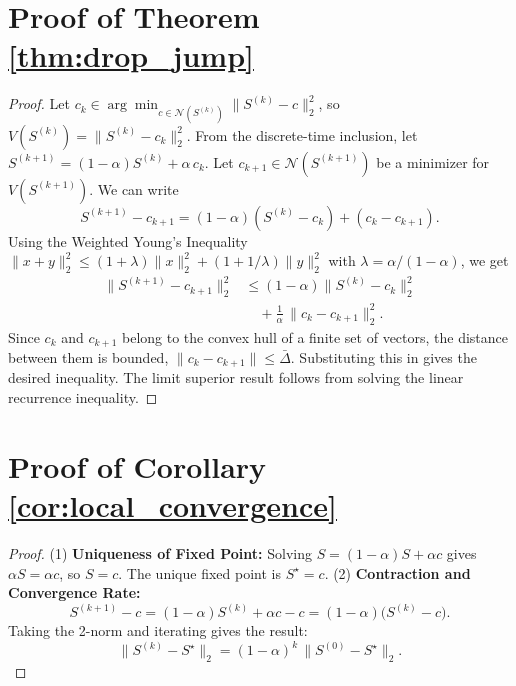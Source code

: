 \documentclass{ccjnl}
\begin{document}
\section{Proof of Theorem \ref{thm:drop_jump}}
\label{app:proof_thm_drop_jump}
\begin{proof}
Let $c_k\in\arg\min_{c\in\mathcal N(S^{(k)})}\|S^{(k)}-c\|_2^2$, so $V(S^{(k)})=\|S^{(k)}-c_k\|_2^2$.
From the discrete-time inclusion, let $S^{(k+1)}=(1-\alpha)S^{(k)}+\alpha\,c_k$.
Let $c_{k+1}\in\mathcal N(S^{(k+1)})$ be a minimizer for $V(S^{(k+1)})$. We can write
\begin{equation}
S^{(k+1)}-c_{k+1}=(1-\alpha)(S^{(k)}-c_k) + (c_k-c_{k+1}).
\end{equation}
Using the Weighted Young's Inequality $\|x+y\|_2^2\le (1+\lambda)\|x\|_2^2+(1+1/\lambda)\|y\|_2^2$ with $\lambda=\alpha/(1-\alpha)$, we get
\begin{equation}
\begin{split}
\|S^{(k+1)}-c_{k+1}\|_2^2
&\le (1-\alpha)\|S^{(k)}-c_k\|_2^2 \\
&\quad + \frac{1}{\alpha}\,\|c_k-c_{k+1}\|_2^2.
\end{split}
\end{equation}
Since $c_k$ and $c_{k+1}$ belong to the convex hull of a finite set of vectors, the distance between them is bounded, $\|c_k-c_{k+1}\|\le \bar\Delta$. Substituting this in gives the desired inequality. The limit superior result follows from solving the linear recurrence inequality.
\end{proof}

\section{Proof of Corollary \ref{cor:local_convergence}}
\label{app:proof_cor_local_convergence}
\begin{proof}
(1) \textbf{Uniqueness of Fixed Point:} Solving $S=(1-\alpha)S+\alpha c$ gives $\alpha S=\alpha c$, so $S=c$. The unique fixed point is $S^\star=c$.
(2) \textbf{Contraction and Convergence Rate:}
\begin{equation}
S^{(k+1)}-c = (1-\alpha)S^{(k)}+\alpha c-c = (1-\alpha)\big(S^{(k)}-c\big).
\end{equation}
Taking the 2-norm and iterating gives the result:
\begin{equation}
\|S^{(k)}-S^\star\|_2 = (1-\alpha)^k\,\|S^{(0)}-S^\star\|_2.
\end{equation}
\end{proof}
\end{document}
